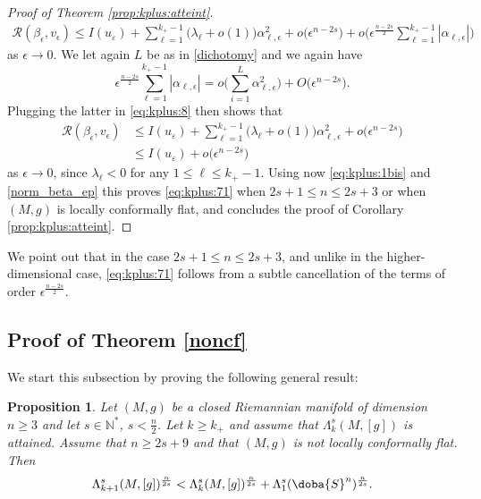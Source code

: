 \documentclass[10pt]{amsart}
\numberwithin{equation}{section}
\def\La{{\Lambda}}
\def\ep{{\varepsilon}}
\gdef\mS{\doba{S}}
\newcommand{\ve}{\varepsilon}
\def \ep{\epsilon}
\theoremstyle{plain}
\newtheorem{prop}[theo]{Proposition}%
\theoremstyle{remark}
\begin{document}
\begin{proof}[Proof of Theorem \ref{prop:kplus:atteint}]
\begin{equation} \label{eq:kplus:8} 
\begin{aligned}
\mathcal{R}(\beta_\ep, v_\ep)  \le I(u_\ve)  + \sum_{\ell=1}^{k_+-1} \big( \lambda_\ell + o(1) \big) \alpha_{\ell,\ep}^2 + o \big( \ep^{n-2s} \big) + o \big( \ep^{\frac{n-2s}{2}} \sum_{\ell=1}^{k_+-1}|\alpha_{\ell,\ep}| \big)
\end{aligned}
\end{equation}
as $\ep \to 0$. We let again $L$ be as in \eqref{dichotomy} and we again have 
$$ \ep^{\frac{n-2s}{2}} \sum_{\ell=1}^{k_+-1} |\alpha_{\ell,\ep}|= o \Big( \sum_{i=1}^{L} \alpha_{\ell,\ep}^2 \Big) + O\big( \ep^{n-2s} \big). $$
Plugging the latter in \eqref{eq:kplus:8} then shows that 
\begin{equation*} %
\begin{aligned}
\mathcal{R}(\beta_\ep, v_\ep) &  \le I(u_\ve)  + \sum_{\ell=1}^{k_+-1} \big( \lambda_\ell + o(1) \big) \alpha_{\ell,\ep}^2 + o \big( \ep^{n-2s} \big) \\
& \le I(u_\ve)+ o \big( \ep^{n-2s} \big)
\end{aligned}
\end{equation*}
as $\ep \to 0$, since $\lambda_{\ell}<0$ for any $1 \le \ell \le k_+-1$. Using now \eqref{eq:kplus:1bis} and \eqref{norm_beta_ep} this proves \eqref{eq:kplus:71} when $2s+1 \le n \le 2s+3$ or when $(M,g)$ is locally conformally flat, and concludes the proof of Corollary \ref{prop:kplus:atteint}.
 \end{proof}
 
 
 We point out that in the case $2s+1 \le n \le 2s+3$, and unlike in the higher-dimensional case, \eqref{eq:kplus:71} follows from a subtle cancellation of the terms of order $\ep^{\frac{n-2s}{2}}$. 
 
 \subsection{Proof of Theorem \ref{noncf}}
 
 
We start this subsection by proving the following general result: 

\begin{prop} \label{prop:fonctions:test:atteint}
Let $(M,g)$ be a closed Riemannian manifold of dimension $n \ge 3$ and let $s \in \mathbb{N}^*$, $s < \frac{n}{2}$. Let $k \ge k_+$ and assume that $\Lambda_k^s(M,[g])$ is attained. Assume that $n \ge 2s+9$ and that $(M,g)$ is not locally conformally flat. Then 
\begin{equation} \label{muk+1}
 \La_{k+1}^s(M,[g])^{\frac{n}{2s}} <  \La_k^s(M,[g])^{\frac{n}{2s}}+\La_1^s(\mS^n)^{\frac{n}{2s}}.
\end{equation}
\end{prop}
\end{document}
